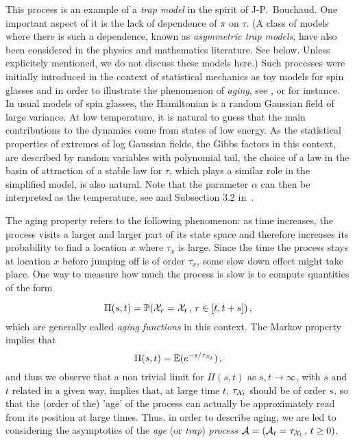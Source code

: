 This process is an example of a {\it trap model} in the spirit of J-P.~Bouchaud.  
 One important aspect of it is the lack of dependence of $\pi$ on $\tau$. (A class of models where there is such a dependence,
known as {\it asymmetric trap models}, have also been considered in the physics and mathematics literature. See below. Unless explicitely mentioned,
we do not discuss these models here.)
Such processes were initially introduced in the context of statistical mechanics as 
toy models for spin glasses and in order to illustrate the phenomenon of {\it aging}, see \cite{kn:Bou}, 
\cite{kn:BD} or \cite{kn:BCKM} for instance. 
In usual models of spin glasses, the Hamiltonian is a random Gaussian field of large variance. 
 At low temperature, it is natural to guess that the main contributions to the dynamics come from states of 
 low energy. 
As the statistical properties of extremes of 
 log Gaussian fields, the Gibbs factors in this context, are described by random variables 
with polynomial tail, the choice of a law in the basin of attraction of a stable law for $\tau$, 
 which plays a similar role in the simplified model,
is also natural. Note that the parameter $\alpha$ can then be interpreted as the
temperature, see \cite{kn:BBM}  and Subsection 3.2 in~\cite{kn:FL}. 

The aging property refers to the following phenomenon: as time increases, 
the process visits a larger and larger part of 
its state space and therefore increases its probability to find a location $x$ where $\tau_x$ is large. 
Since the time the process stays at location $x$ before jumping off is of order $\tau_x$, some slow down 
effect might take place. One way to measure how much the process is slow is to compute quantities of 
the form
 
\begin{equation}\label{eq:af}
\Pi(s,t)=\P(\X_r=\X_t\,,\, r\in[t,t+s])\,,
\end{equation}  
which are generally called {\it aging functions} in this context.
The Markov property implies that 
\begin{equation}\label{eq:af1}
\Pi(s,t)=\esp(e^{-s/{\tau_{\X_t}}})\,,
\end{equation}  
and thus we observe that a non trivial limit for $\Pi(s,t)$ as $s,t\to\infty$, with $s$ and $t$ related in a given way,
implies that, at large time $t$, 
$\tau_{{\cal X}_t}$ should be of order $s$, so that the (order of the) 'age' of the process can actually be approximately 
read from its position at large times. Thus, in order to describe aging, we are led to considering the asymptotics of 
the {\it age} (or  {\it trap}) {\it process} 
${\cal A}=({\cal A}_t=\tau_{{\cal X}_t}\,,\,t\geq 0)$. 

